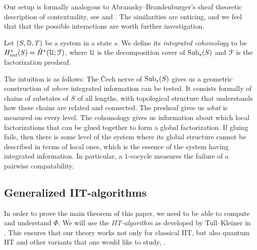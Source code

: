 \begin{remark}
    Our setup is formally analogous to Abramsky--Brandenburger's sheaf theoretic description of contextuality, see \citeme and \citeme. The similarities are enticing, and we feel that that the possible interactions are worth further investigation. 
\end{remark}

\begin{definition}
    Let $(S,\mathbb{D},T)$ be a system in a state $s$. We define its \emph{integrated cohomology} to be $H_{int}^*(S) = \check{H}^*(\EuScript{U};\EuScript{F})$, where $\EuScript{U}$ is the decomposition cover of $\operatorname{Sub}_s(S)$ and $\EuScript{F}$ is the factorization presheaf.  
\end{definition}


The intuition is as follows: The \v{C}ech nerve of $\operatorname{Sub}_s(S)$ gives us a geometric construction of \emph{where} integrated information can be tested. It consists formally of chains of substates of $S$ of all lengths, with topological structure that understands how these chains are related and connected. The presheaf gives us \emph{what} is measured on every level. The cohomology gives us information about which local factorizations that can be glued together to form a global factorization. If gluing fails, then there is some level of the system where its global structure cannot be described in terms of local ones, which is the essence of the system having integrated information. In particular, a $1$-cocycle measures the failure of a pairwise compatability. 

\begin{definition}
    
\end{definition}











\subsection{Generalized IIT-algorithms}

In order to prove the main theorem of this paper, we need to be able to compute and understand $\Phi$. We will use the \emph{IIT-algorithm} as developed by Tull--Kleiner in \citeme. This ensures that our theory works not only for classical IIT, but also quantum IIT and other variants that one would like to study, \citeme. 

